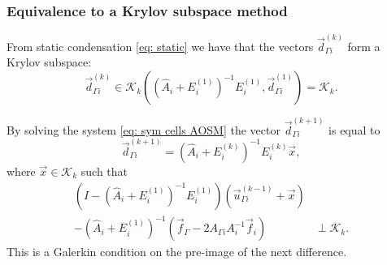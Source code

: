 \documentclass[10pt]{beamer}
\begin{document}
\begin{frame}
\frametitle{Equivalence to a Krylov subspace method}

From static condensation \eqref{eq: static} we have that the vectors $\vec{d}_{\Gamma i}^{(k)}$ form a Krylov subspace:
\begin{equation*}
	\vec{d}_{\Gamma i}^{(k)} \in \mathcal{K}_k \left ( \left ( \hat{A}_i + E_i^{(1)} \right )^{-1} E_i^{(1)}, \vec{d}_{\Gamma i}^{(1)} \right ) = \mathcal{K}_k.
\end{equation*}

By solving the system \eqref{eq: sym cells AOSM} the vector $\vec{d}_{\Gamma i}^{(k+1)}$ is equal to
\begin{equation*}
	\vec{d}_{\Gamma i}^{(k+1)} = \left ( \hat{A}_i + E_i^{(k)} \right )^{-1} E_i^{(k)} \vec{x},
\end{equation*}
where $\vec{x} \in \mathcal{K}_k$ such that
\begin{align*}
	\left ( I -  \left ( \hat{A}_i + E_i^{(1)} \right )^{-1} E_i^{(1)} \right ) \left ( \vec{u}_{\Gamma i}^{(k-1)} + \vec{x} \right ) & \\
	- \left ( \hat{A}_i + E_i^{(1)} \right )^{-1} \left ( \vec{f}_\Gamma - 2 A_{\Gamma i} A_i^{-1} \vec{f}_i \right ) & \perp \mathcal{K}_k.
\end{align*}
This is a Galerkin condition on the pre-image of the next difference.
\end{frame}
\end{document}
